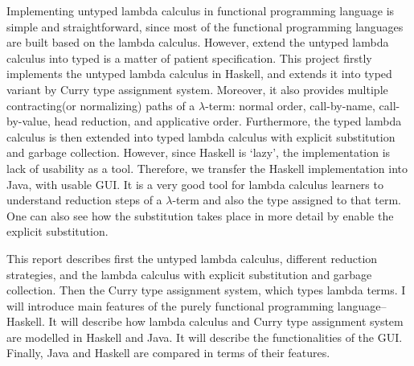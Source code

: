 Implementing untyped lambda calculus in functional programming language is simple and straightforward, since most of the functional programming languages are built based on the lambda calculus. However, extend the untyped lambda calculus into typed is a matter of patient specification. This project firstly implements the untyped lambda calculus in Haskell, and extends it into typed variant by Curry type assignment system. Moreover, it also provides multiple contracting(or normalizing) paths of a $\lambda$-term: normal order, call-by-name, call-by-value, head reduction, and applicative order. Furthermore, the typed lambda calculus is then extended into typed lambda calculus with explicit substitution and garbage collection. However, since Haskell is `lazy', the implementation is lack of usability as a tool. Therefore, we transfer the Haskell implementation into Java, with usable GUI. It is a very good tool for lambda calculus learners to understand reduction steps of a $\lambda$-term and also the type assigned to that term. One can also see how the substitution takes place in more detail by enable the explicit substitution.        

This report describes first the untyped lambda calculus, different reduction strategies, and the lambda calculus with explicit substitution and garbage collection. Then the Curry type assignment system, which types lambda terms. I will introduce main features of the purely functional programming language--Haskell. It will describe how lambda calculus and Curry type assignment system are modelled in Haskell and Java. It will describe the functionalities of the GUI. Finally, Java and Haskell are compared in terms of their features.  








